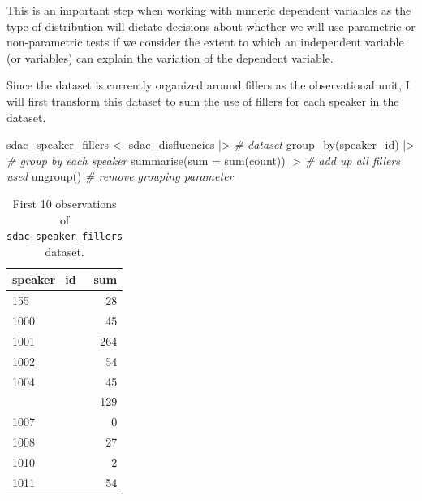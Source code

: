 \documentclass[
  letterpaper,
]{latex/krantz}
\newenvironment{Shaded}{\begin{snugshade}}{\end{snugshade}}
\newcommand{\AttributeTok}[1]{\textcolor[rgb]{0.00,0.00,0.00}{#1}}
\newcommand{\CommentTok}[1]{\textcolor[rgb]{0.00,0.00,0.00}{\textit{#1}}}
\newcommand{\FunctionTok}[1]{\textcolor[rgb]{0.00,0.00,0.00}{#1}}
\newcommand{\NormalTok}[1]{\textcolor[rgb]{0.00,0.00,0.00}{#1}}
\newcommand{\OtherTok}[1]{\textcolor[rgb]{0.00,0.00,0.00}{#1}}
\newcommand{\SpecialCharTok}[1]{\textcolor[rgb]{0.00,0.00,0.00}{#1}}
\begin{document}
\begin{tcolorbox}[enhanced jigsaw, colbacktitle=quarto-callout-warning-color!10!white, arc=.35mm, toprule=.15mm, breakable, colframe=quarto-callout-warning-color-frame, bottomrule=.15mm, opacitybacktitle=0.6, coltitle=black, titlerule=0mm, colback=white, toptitle=1mm, bottomtitle=1mm, title=\textcolor{quarto-callout-warning-color}{\faExclamationTriangle}\hspace{0.5em}{Tip}, rightrule=.15mm, leftrule=.75mm, opacityback=0, left=2mm]

This is an important step when working with numeric dependent variables
as the type of distribution will dictate decisions about whether we will
use parametric or non-parametric tests if we consider the extent to
which an independent variable (or variables) can explain the variation
of the dependent variable.

\end{tcolorbox}

Since the dataset is currently organized around fillers as the
observational unit, I will first transform this dataset to sum the use
of fillers for each speaker in the dataset.

\begin{Shaded}
\begin{Highlighting}[]
\NormalTok{sdac\_speaker\_fillers }\OtherTok{\textless{}{-}} 
\NormalTok{  sdac\_disfluencies }\SpecialCharTok{|\textgreater{}} \CommentTok{\# dataset}
  \FunctionTok{group\_by}\NormalTok{(speaker\_id) }\SpecialCharTok{|\textgreater{}} \CommentTok{\# group by each speaker}
  \FunctionTok{summarise}\NormalTok{(}\AttributeTok{sum =} \FunctionTok{sum}\NormalTok{(count)) }\SpecialCharTok{|\textgreater{}} \CommentTok{\# add up all fillers used}
  \FunctionTok{ungroup}\NormalTok{() }\CommentTok{\# remove grouping parameter}
\end{Highlighting}
\end{Shaded}

\hypertarget{tbl-i-uni-cont-sdac-transform-preview}{}
\begin{table}
\caption{\label{tbl-i-uni-cont-sdac-transform-preview}First 10 observations of \texttt{sdac\_speaker\_fillers} dataset. }\tabularnewline

\centering
\begin{tabular}{lr}
\toprule
speaker\_id & sum\\
\midrule
155 & 28\\
1000 & 45\\
1001 & 264\\
1002 & 54\\
1004 & 45\\
\addlinespace
1005 & 129\\
1007 & 0\\
1008 & 27\\
1010 & 2\\
1011 & 54\\
\bottomrule
\end{tabular}
\end{table}
\end{document}
